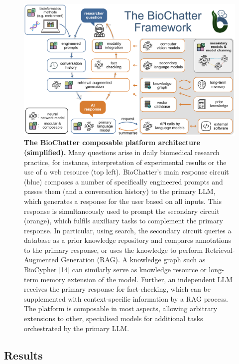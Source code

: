 \begin{figure}
\hypertarget{fig:overview}{%
\centering
\includegraphics{images/biochatter_overview.png}
\caption{\textbf{The BioChatter composable platform architecture (simplified).}
Many questions arise in daily biomedical research practice, for instance, interpretation of experimental results or the use of a web resource (top left).
BioChatter's main response circuit (blue) composes a number of specifically engineered prompts and passes them (and a conversation history) to the primary LLM, which generates a response for the user based on all inputs.
This response is simultaneously used to prompt the secondary circuit (orange), which fulfils auxiliary tasks to complement the primary response.
In particular, using search, the secondary circuit queries a database as a prior knowledge repository and compares annotations to the primary response, or uses the knowledge to perform Retrieval-Augmented Generation (RAG).
A knowledge graph such as BioCypher {[}\protect\hyperlink{ref-tr1XjZ1R}{14}{]} can similarly serve as knowledge resource or long-term memory extension of the model.
Further, an independent LLM receives the primary response for fact-checking, which can be supplemented with context-specific information by a RAG process.
The platform is composable in most aspects, allowing arbitrary extensions to other, specialised models for additional tasks orchestrated by the primary LLM.}\label{fig:overview}
}
\end{figure}

\hypertarget{results}{%
\subsection{Results}\label{results}}

